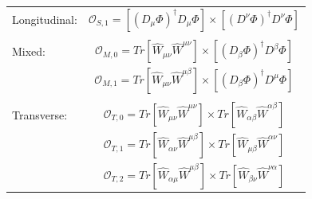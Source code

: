 \documentclass[../Bachelorarbeit.tex]{subfiles}
\begin{document}
\begin{table}[h]
    \centering
    \begin{tabular}{ l c }
        Longitudinal: & $\mathcal{O}_{S,1} = [(D_{\mu}\Phi)^{\dagger} D_{\mu}\Phi] \times [(D^{\nu}\Phi)^{\dagger} D^{\nu}\Phi]$                         \\
                      &                                                                                                                                  \\
        Mixed:        & $\mathcal{O}_{M,0} = Tr[\widehat{W}_{\mu\nu}\widehat{W}^{\mu\nu}] \times [(D_{\beta}\Phi)^{\dagger} D^{\beta}\Phi]$              \\
                      & $\mathcal{O}_{M,1} = Tr[\widehat{W}_{\mu\nu}\widehat{W}^{\mu\beta}] \times [(D_{\beta}\Phi)^{\dagger} D^{\mu}\Phi]$              \\
                      &                                                                                                                                  \\
        Transverse:   & $\mathcal{O}_{T,0} = Tr[\widehat{W}_{\mu\nu}\widehat{W}^{\mu\nu}] \times Tr[\widehat{W}_{\alpha\beta}\widehat{W}^{\alpha\beta}]$ \\
                      & $\mathcal{O}_{T,1} = Tr[\widehat{W}_{\alpha\nu}\widehat{W}^{\mu\beta}] \times Tr[\widehat{W}_{\mu\beta}\widehat{W}^{\alpha\nu}]$ \\
                      & $\mathcal{O}_{T,2} = Tr[\widehat{W}_{\alpha\mu}\widehat{W}^{\mu\beta}] \times Tr[\widehat{W}_{\beta\nu}\widehat{W}^{\nu\alpha}]$ \\
    \end{tabular}
\end{table}
\end{document}

